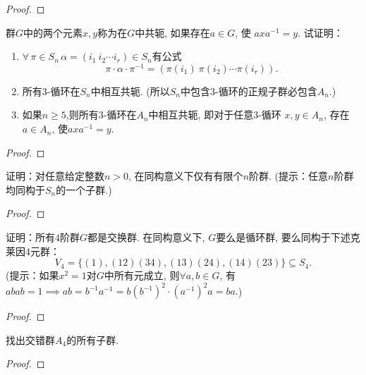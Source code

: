\begin{proof}
    
\end{proof}

\begin{problem}
    群$G$中的两个元素$x, y$称为在$G$中共轭, 如果存在$a \in G$, 使
$axa^{-1} = y$. 试证明：
\begin{enumerate}[(1)]
    \item $\forall\, \pi \in S_n\, \alpha = (i_1\:i_2 \cdots i_r) \in S_n$有公式
\[
    \pi \cdot \alpha \cdot \pi^{-1} = (\pi(i_1)\:\pi(i_2) \cdots \pi(i_r)).
\]
    \item 所有$3$-循环在$S_n$中相互共轭.
(所以$S_n$中包含$3$-循环的正规子群必包含$A_n$.)
    \item 如果$n \geqslant 5$,则所有$3$-循环在$A_n$中相互共轭, 即对于任意$3$-循环
$x,y \in A_n$, 存在$a \in A_n$, 使$axa^{-1} = y$.
\end{enumerate}
\end{problem}

\begin{proof}
    
\end{proof}

\begin{problem}
    证明：对任意给定整数$n > 0$, 在同构意义下仅有有限个$n$阶群.
(提示：任意$n$阶群均同构于$S_n$的一个子群.)
\end{problem}

\begin{proof}
    
\end{proof}

\begin{problem}
    证明：所有$4$阶群$G$都是交换群. 在同构意义下, $G$要么是循环群, 
要么同构于下述克莱因$4$元群：
\[
    V_4 = \{(1), (12)(34), (13)(24), (14)(23)\} \subseteq S_4.
\]
(提示：如果$x^2 = 1$对$G$中所有元成立, 则$\forall a, b \in G$, 有
$abab = 1 \implies ab = b^{-1}a^{-1} = b(b^{-1})^2 \cdot (a^{-1})^2a = ba.$)
\end{problem}

\begin{proof}
    
\end{proof}

\begin{problem}
    找出交错群$A_4$的所有子群.
\end{problem}

\begin{proof}

\end{proof}